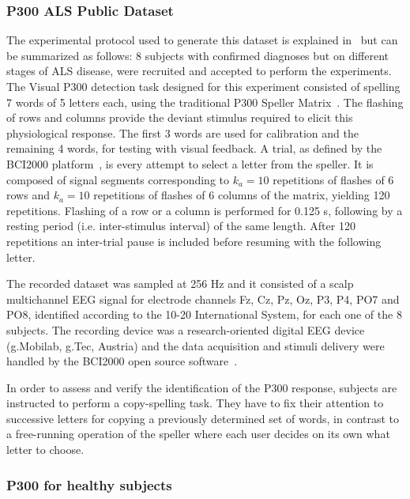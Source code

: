 \documentclass[utf8]{frontiersSCNS} %
\begin{document}
\subsubsection{P300 ALS Public Dataset} \label{ALSDataset}

The experimental protocol used to generate this dataset is explained in~\citep{Riccio2013} but can be summarized as follows:  8 subjects with confirmed diagnoses but on different stages of ALS disease, were recruited and accepted to perform the experiments. The Visual P300 detection task designed for this experiment consisted of spelling 7 words of 5 letters each, using the traditional P300 Speller Matrix~\citep{Farwell1988}. The flashing of rows and columns provide the deviant stimulus required to elicit this physiological response.  The first 3 words are used for calibration and the remaining 4 words, for testing with visual feedback.  A trial, as defined by the BCI2000 platform~\citep{Schalk2004}, is every attempt to select a letter from the speller. It is composed of signal segments corresponding to $k_a =10$ repetitions of flashes of 6 rows and $k_a =10$ repetitions of flashes of 6 columns of the matrix, yielding 120 repetitions.  Flashing of a row or a column is performed for 0.125 s, following by a resting period (i.e. inter-stimulus interval) of the same length.  After 120 repetitions an inter-trial pause is included before resuming with the following letter.

The recorded dataset was sampled at 256 Hz and it consisted of a scalp multichannel EEG signal for electrode channels Fz, Cz, Pz, Oz, P3, P4, PO7 and PO8, identified according to the 10-20 International System,  for each one of the 8 subjects.   The recording device was a research-oriented digital EEG device (g.Mobilab, g.Tec, Austria) and the data acquisition and stimuli delivery were handled by the BCI2000 open source software~\citep{Schalk2004}.

In order to assess and verify the identification of the P300 response, subjects are instructed to perform a copy-spelling task. They have to fix their attention to successive letters for copying a previously determined set of words, in contrast to a free-running operation of the speller where each user decides on its own what letter to choose.

\subsubsection{P300 for healthy subjects}
\end{document}
